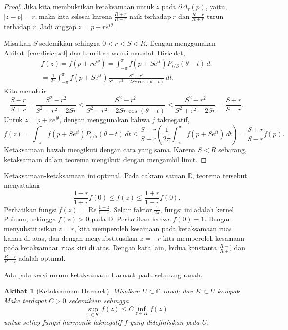 \documentclass[12pt,openany]{book}
\renewcommand{\Re}{\operatorname{Re}}
\newcommand{\sabs}[1]{\lvert {#1} \rvert}
\newcommand{\C}{{\mathbb{C}}}
\newcommand{\D}{{\mathbb{D}}}
\theoremstyle{plain}
\newtheorem{cor}[thm]{Akibat}
\theoremstyle{remark}
\theoremstyle{definition}
\theoremstyle{exercise}
\theoremstyle{example}
\newcommand{\corref}[1]{\hyperref[#1]{Akibat~\ref*{#1}}}
\begin{document}
\begin{proof}
Jika kita membuktikan ketaksamaan untuk $z$ pada 
$\partial \Delta_r(p)$, yaitu, $\sabs{z-p}=r$, maka kita selesai
karena $\frac{R+r}{R-r}$ naik terhadap $r$ dan
$\frac{R-r}{R+r}$ turun terhadap $r$.  Jadi 
anggap $z = p+re^{i\theta}$.

Misalkan $S$ sedemikian sehingga $0 < r < S < R$.
Dengan menggunakan \corref{cor:dirichsol} dan keunikan
solusi masalah
Dirichlet,
\begin{multline*}
f(z)
=
f(p + re^{i\theta})
=
\int_{-\pi}^\pi f(p+Se^{it}) P_{r/S}(\theta-t) \, dt
\\
=
\frac{1}{2\pi} 
\int_{-\pi}^\pi f(p+Se^{it})
\frac{S^2-r^2}{S^2+r^2-2Sr \cos (\theta-t)}
\, dt .
\end{multline*}
Kita menaksir
\begin{equation*}
\frac{S-r}{S+r}
=
\frac{S^2-r^2}{S^2+r^2+2Sr}
\leq
\frac{S^2-r^2}{S^2+r^2-2Sr \cos (\theta-t)}
\leq
\frac{S^2-r^2}{S^2+r^2-2Sr}
=
\frac{S+r}{S-r} .
\end{equation*}
Untuk $z = p+re^{i\theta}$,
dengan menggunakan bahwa $f$ taknegatif,
\begin{equation*}
f(z)
=
\int_{-\pi}^\pi f(p+Se^{it}) P_{r/S}(\theta-t) \, dt
\leq
\frac{S+r}{S-r} 
\left(
\frac{1}{2\pi}
\int_{-\pi}^\pi f(p+Se^{it}) \, dt
\right)
=
\frac{S+r}{S-r} 
f(p) .
\end{equation*}
Ketaksamaan bawah mengikuti dengan cara yang sama.
Karena $S<R$ sebarang, ketaksamaan dalam teorema 
mengikuti dengan mengambil limit.
\end{proof}

Ketaksamaan-ketaksamaan ini optimal.  Pada cakram satuan $\D$, teorema tersebut menyatakan
\begin{equation*}
\frac{1-r}{1+r} f(0) \leq f(z) \leq \frac{1+r}{1-r} f(0) .
\end{equation*}
Perhatikan fungsi $f(z) = \Re \frac{1+z}{1-z}$.  Selain faktor
$\frac{1}{2\pi}$, fungsi ini adalah kernel Poisson, sehingga 
$f(z) > 0$ pada $\D$.  Perhatikan bahwa $f(0)=1$.  Dengan menyubstitusikan $z=r$, kita memperoleh
kesamaan pada ketaksamaan ruas kanan di atas, dan dengan menyubstitusikan $z=-r$
kita memperoleh kesamaan pada ketaksamaan ruas kiri di atas.  Dengan kata lain,
kedua konstanta
$\frac{R-r}{R+r}$ dan $\frac{R+r}{R-r}$ adalah optimal.

Ada pula versi umum ketaksamaan Harnack pada sebarang ranah.

\begin{cor}[Ketaksamaan Harnack]
Misalkan $U \subset \C$ ranah dan $K \subset U$ kompak.
Maka terdapat $C > 0$ sedemikian sehingga
\begin{equation*}
\sup_{z \in K} f(z) \leq C \inf_{z\in K} f(z)
\end{equation*}
untuk setiap fungsi harmonik taknegatif $f$ yang didefinisikan pada $U$.
\end{cor}
\end{document}
